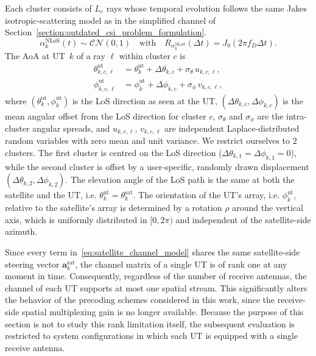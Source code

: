 Each cluster consists of $L_c$ rays whose temporal evolution follows the same Jakes isotropic-scattering model as in the simplified channel of
Section~\ref{section:outdated_csi_problem_formulation}.
\begin{equation}
\label{eq:nlos_gain}
    \alpha_k^{\mathrm{NLoS}}(t) \sim \mathcal{CN}(0, 1) \quad \text{with} \quad R_{\alpha_k^{\mathrm{NLoS}}}(\Delta t) = J_0(2\pi f_D \Delta t).
\end{equation}
The \ac{AoA} at \ac{UT}~$k$ of a ray $\ell$ within cluster $c$ is
\begin{align}
    \theta^{\mathrm{ut}}_{k,c,\ell} &= \theta^{\mathrm{ut}}_k + \Delta\theta_{k,c} + \sigma_\theta\, u_{k,c,\ell},
    \label{eq:nlos_elevation_angles}\\
    \phi^{\mathrm{ut}}_{k,c,\ell} &= \phi^{\mathrm{ut}}_k + \Delta\phi_{k,c} + \sigma_\phi\, v_{k,c,\ell},
    \label{eq:nlos_azimuth_angles}
\end{align}
where $(\theta^{\mathrm{ut}}_k, \phi^{\mathrm{ut}}_k)$ is the \ac{LoS} direction as seen at the \ac{UT}, $(\Delta\theta_{k,c}, \Delta\phi_{k,c})$ is the mean angular offset from the \ac{LoS} direction for cluster $c$, $\sigma_\theta$ and $\sigma_\phi$ are the intra-cluster angular spreads, and $u_{k,c,\ell}$, $v_{k,c,\ell}$ are independent Laplace-distributed random variables with zero mean and unit variance.
We restrict ourselves to $2$ clusters.
The first cluster is centred on the \ac{LoS} direction ($\Delta\theta_{k,1} = \Delta\phi_{k,1} = 0$), while the second cluster is offset by a user-specific, randomly drawn displacement $(\Delta\theta_{k,2}, \Delta\phi_{k,2})$.
The elevation angle of the \ac{LoS} path is the same at both the satellite and the \ac{UT}, i.e. $\theta^{\mathrm{ut}}_k = \theta^{\mathrm{sat}}_k$.
The orientation of the \ac{UT}'s array, i.e. $\phi^{\mathrm{ut}}_k$, relative to the satellite's array is determined by a rotation $\rho$ around the vertical axis, which is uniformly distributed in $[0, 2\pi)$ and independent of the satellite-side azimuth.
\medskip

Since every term in~\eqref{eq:satellite_channel_model} shares the same satellite-side steering vector $\mathbf{a}^{\mathrm{sat}}_k$, the channel matrix of a single \ac{UT} is of rank one at any moment in time.
Consequently, regardless of the number of receive antennas, the channel of each \ac{UT} supports at most one spatial stream.
This significantly alters the behavior of the precoding schemes considered in this work, since the receive-side spatial multiplexing gain is no longer available.
Because the purpose of this section is not to study this rank limitation itself, the subsequent evaluation is restricted to system configurations in which each \ac{UT} is equipped with a single receive antenna.

